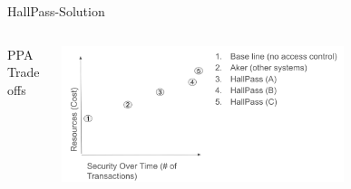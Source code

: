 \begin{frame}{HallPass-Solution}
    \begin{columns}
        \begin{column}{0.5\textwidth}
        PPA Tradeoffs
        \end{column}
        \begin{column}{0.5\textwidth}
            \centering
            \includegraphics[height=0.7\textheight,width=0.7\textwidth,keepaspectratio]{tradeoffs.png}
        \end{column}
    \end{columns}
\end{frame}
